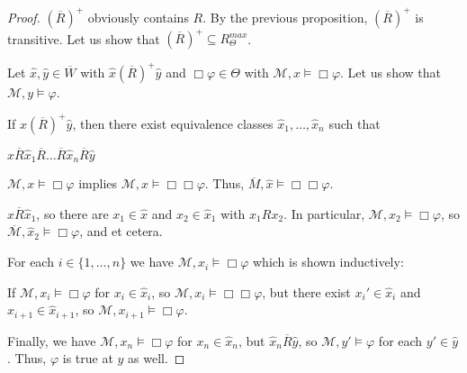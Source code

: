 \documentclass[a4paper]{article}
\theoremstyle{defin}
\theoremstyle{theorem}
\theoremstyle{prop}
\theoremstyle{lemma}
\theoremstyle{ex}
\theoremstyle{col}
\begin{document}
\begin{proof}
  $(\overline{R})^{+}$ obviously contains $R$. By the previous proposition, $(\overline{R})^{+}$ is transitive.
  Let us show that $(\overline{R})^{+} \subseteq R^{max}_{\Theta}$.

  Let $\hat{x}, \hat{y} \in \overline{W}$ with $\hat{x} (\overline{R})^{+} \hat{y}$ and
  $\Box \varphi \in \Theta$ with $\mathcal{M}, x \models \Box \varphi$. Let us show that $\mathcal{M}, y \models \varphi$.

  If $\hat{x} (\overline{R})^{+} \hat{y}$, then there exist equivalence classes $\hat{x}_1, \dots, \hat{x}_n$ such that
  \begin{center}
    $\hat{x} \overline{R} \hat{x}_1 \overline{R} \dots \overline{R} \hat{x}_n \overline{R} \hat{y}$
  \end{center}

  $\mathcal{M}, x \models \Box \varphi$ implies $\mathcal{M}, x \models \Box \Box \varphi$. Thus, $\overline{M}, \hat{x} \models \Box \Box \varphi$.

  $\hat{x} \overline{R} \hat{x}_1$, so there are $x_1 \in \hat{x}$ and $x_2 \in \hat{x}_1$ with $x_1 R x_2$. In particular, $\mathcal{M}, x_2 \models \Box \varphi$,
  so $\overline{\mathcal{M}}, \hat{x}_2 \models \Box \varphi$, and et cetera.

  For each $i \in \{1, \dots, n\}$ we have $\mathcal{M}, x_i \models \Box \varphi$ which is shown inductively:

  If $\mathcal{M}, x_i \models \Box \varphi$ for $x_i \in \hat{x}_i$, so $\mathcal{M}, x_i \models \Box \Box \varphi$, but there exist ${x_i}' \in \hat{x}_i$ and $x_{i + 1} \in \hat{x}_{i + 1}$, so
  $\mathcal{M}, x_{i + 1} \models \Box \varphi$.

  Finally, we have $\mathcal{M}, x_n \models \Box \varphi$ for $x_n \in \hat{x}_n$, but $\hat{x}_n \overline{R} \hat{y}$, so $\mathcal{M}, y' \models \varphi$ for each $y' \in \hat{y}$. Thus, $\varphi$ is true at $y$ as well.
\end{proof}
\end{document}
